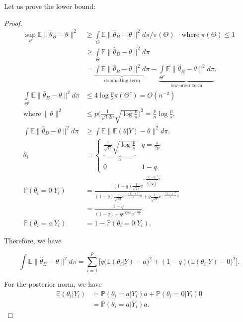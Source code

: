 \documentclass[twoside]{article}
\theoremstyle{definition}
\theoremstyle{definition}
\theoremstyle{remark}
\begin{document}
Let us prove the lower bound:

\begin{proof}

\[
\begin{aligned}
\sup \limits_\theta \mathbb{E} \| \hat\theta_B - \theta \|^2 &\geq \int \limits_\Theta \mathbb{E} \| \hat\theta_B - \theta \|^2 d\pi / \pi(\Theta) \quad \text{where} \ \pi(\Theta) \leq 1 \\
&\geq \int \limits_\Theta \mathbb{E} \| \hat\theta_B - \theta \|^2 d\pi \\
&= \underbrace{\int \mathbb{E} \| \hat\theta_B - \theta \|^2 d\pi}_\text{dominating term} - \underbrace{\int \limits_{\Theta^c} \mathbb{E} \| \hat\theta_B - \theta \|^2 d\pi}_\text{low-order term}. \\
\int \limits_{\Theta^c} \mathbb{E} \| \hat\theta_B - \theta \|^2 d\pi &\leq 4 \log \frac{p}{s} \pi (\Theta^c) = O(n^{-2}) \\
\text{where} \ \| \theta \|^2 &\leq p \Bigg( \frac{1}{\sqrt12{n}} \sqrt{\log \frac{p}{s}} \Bigg)^2 = \frac{p}{n} \log \frac{p}{s}. \\
\int \mathbb{E} \| \hat\theta_B - \theta \|^2 d\pi &\geq \int \mathbb{E} \| \mathbb{E} (\theta | Y) - \theta \|^2 d\pi. \\
\theta_i &= \begin{cases}
\underbrace{\frac{1}{\sqrt{n}} \sqrt{\log \frac{p}{s}}}_\text{a} & q= \frac{s}{2p} \\
0 & 1-q.
\end{cases} \\
\mathbb{P} (\theta_i = 0 | Y_i) &= \frac{(1-q) \frac{1}{\sqrt{2\pi}} \mathrm{e}^{-\frac{(Y_i - 0)^2}{2(\frac{1}{\sqrt{n}})^2}n}}{(1-q) \frac{1}{\sqrt{2\pi}} \mathrm{e}^{-\frac{(Y_i - 0)^2}{2}n} + q \frac{1}{\sqrt{2\pi}} \mathrm{e}^{-\frac{(Y_i - a)^2}{2}n}} \\
&= \frac{1-q}{(1-q) + q \mathrm{e}^{Y_i an} \mathrm{e}^{-\frac{na^2}{2}}}. \\
\mathbb{P}(\theta_i = a | Y_i) &= 1 - \mathbb{P} (\theta_i = 0 | Y_i).
\end{aligned}
\]

Therefore, we have

\[
\int \mathbb{E} \| \hat\theta_B - \theta \|^2 d\pi = \sum \limits_{i=1}^p \bigg[ q \bigg( \mathbb{E} (\theta_i | Y) - a \bigg)^2 + (1-q) \bigg( \mathbb{E} (\theta_i | Y) - 0 \bigg)^2 \bigg].
\]

For the posterior norm, we have
\[
\begin{aligned}
\mathbb{E} (\theta_i | Y_i) &= \mathbb{P} (\theta_i = a | Y_i) a + \mathbb{P} (\theta_i = 0 | Y_i) 0 \\
&= \mathbb{P} (\theta_i = a | Y_i) a.
\end{aligned}
\]


\end{proof}
\end{document}
